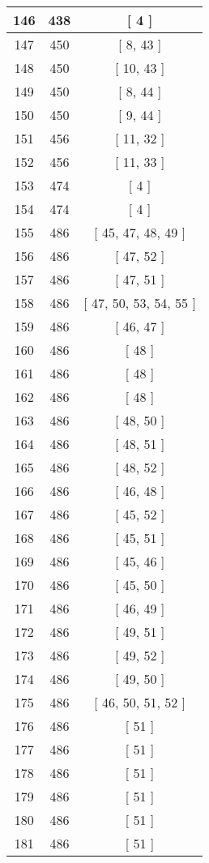 \begin{center}
\begin{longtable}[H]{|| c c c ||}
\hline
146 & 438 & [ 4 ] \\ 
\hline
147 & 450 & [ 8, 43 ] \\ 
\hline
148 & 450 & [ 10, 43 ] \\ 
\hline
149 & 450 & [ 8, 44 ] \\ 
\hline
150 & 450 & [ 9, 44 ] \\ 
\hline
151 & 456 & [ 11, 32 ] \\ 
\hline
152 & 456 & [ 11, 33 ] \\ 
\hline
153 & 474 & [ 4 ] \\ 
\hline
154 & 474 & [ 4 ] \\ 
\hline
155 & 486 & [ 45, 47, 48, 49 ] \\ 
\hline
156 & 486 & [ 47, 52 ] \\ 
\hline
157 & 486 & [ 47, 51 ] \\ 
\hline
158 & 486 & [ 47, 50, 53, 54, 55 ] \\ 
\hline
159 & 486 & [ 46, 47 ] \\ 
\hline
160 & 486 & [ 48 ] \\ 
\hline
161 & 486 & [ 48 ] \\ 
\hline
162 & 486 & [ 48 ] \\ 
\hline
163 & 486 & [ 48, 50 ] \\ 
\hline
164 & 486 & [ 48, 51 ] \\ 
\hline
165 & 486 & [ 48, 52 ] \\ 
\hline
166 & 486 & [ 46, 48 ] \\ 
\hline
167 & 486 & [ 45, 52 ] \\ 
\hline
168 & 486 & [ 45, 51 ] \\ 
\hline
169 & 486 & [ 45, 46 ] \\ 
\hline
170 & 486 & [ 45, 50 ] \\ 
\hline
171 & 486 & [ 46, 49 ] \\ 
\hline
172 & 486 & [ 49, 51 ] \\ 
\hline
173 & 486 & [ 49, 52 ] \\ 
\hline
174 & 486 & [ 49, 50 ] \\ 
\hline
175 & 486 & [ 46, 50, 51, 52 ] \\ 
\hline
176 & 486 & [ 51 ] \\ 
\hline
177 & 486 & [ 51 ] \\ 
\hline
178 & 486 & [ 51 ] \\ 
\hline
179 & 486 & [ 51 ] \\ 
\hline
180 & 486 & [ 51 ] \\ 
\hline
181 & 486 & [ 51 ] \\ 

\end{longtable}
\end{center}
